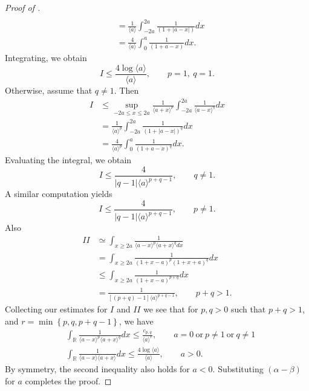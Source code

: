 \documentclass[12pt,reqno]{amsart}
\numberwithin{equation}{section}  %
\renewcommand{\cref}{\Cref}
\newcommand{\rr}{\mathbb{R}}
\begin{document}
\begin{proof}[Proof of \cref{lem:calc}]
\begin{equation*}
\begin{split}
  \\
  & = \frac{1}{\langle a \rangle} \int_{-2a}^{2a} \frac{1}{(1 + | a -
  x
  |)} d x
  \\
  & = \frac{4}{\langle a \rangle} \int_{0}^{a} \frac{1}{(1 + a -
  x)} d x.
\end{split}
\end{equation*}
%
%
Integrating, we obtain
%
%
\begin{equation*}
 I
 \le 
 \frac{4 \log \langle a \rangle}{\langle a \rangle}, \qquad p =1, \ q =1.
\end{equation*}
Otherwise, assume that $q \neq 1$. Then
\begin{equation*}
\begin{split}
  I
  & \le \sup_{-2a \le x \le 2a} \frac{1}{\langle a + x \rangle
  ^{p}} \int_{-2a}^{2a} \frac{1}{\langle a - x \rangle ^{q}} d x
  \\
  & = \frac{1}{\langle a \rangle ^{p}} \int_{-2a}^{2a} \frac{1}{(1 + | a -
  x
  |)^{q}} d x
  \\
  & = \frac{4}{\langle a \rangle ^{p}} \int_{0}^{a} \frac{1}{(1 + a -
  x)^{q}} d x.
\end{split}
\end{equation*}
Evaluating the integral, we obtain
\begin{equation*}
  I \le \frac{4}{|q-1| \langle a \rangle ^{p +q -1}}, \qquad q \neq 1.
\end{equation*}
%
%
A similar computation yields
\begin{equation*}
  I \le \frac{4}{|q-1| \langle a \rangle ^{p +q -1}}, \qquad p \neq 1.
\end{equation*}
%
%
Also
%
%
\begin{equation*}
\begin{split}
  II 
  & \simeq \int_{x \ge 2a} \frac{1}{\langle a - x \rangle ^{p} \langle a
  + x \rangle ^{q} d x}
  \\ 
  & = \int_{x \ge 2a} \frac{1}{(1 + x - a)^{p} (1 + x +
  a)^{q}} d x
  \\
  & \le \int_{x \ge 2a} \frac{1}{(1 + x -a)^{p+q}} d x
  \\
  & = \frac{1}{[(p + q)-1] \langle a \rangle ^{p+q -1}}, \qquad p + q > 1.
\end{split}
\end{equation*}
%
%
Collecting our estimates for $I$ and $II$ we see that for 
$p, q > 0$ such that $p +q >1$, and $r =\min\left\{p, q, p+q-1
 \right\}$, we have 
%
\begin{align*}
  & \int_{\rr} \frac{1}{\langle a - x \rangle ^{p} \langle a + x \rangle
  ^{q}} d x
  \le \frac{c_{p,q}}{\langle a \rangle ^{r}}, \qquad a = 0 \ \text{or} \
  p \neq 1 \ \text{or} \ q \neq 1
  \\
  & \int_{\rr} \frac{1}{\langle a - x \rangle  \langle a + x \rangle
} d x
  \le  \frac{4 \log \langle a \rangle}{\langle a \rangle}, \qquad a > 0.
  \label{est-2}
\end{align*}
By symmetry, the second inequality also holds for $a < 0$. Substituting $(\alpha -
\beta)$ for $a$ completes the proof.
\end{proof}
%
%
%
%
%
%
%				
%
%
%
%
\end{document}
